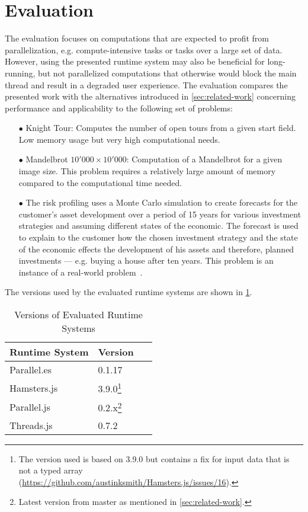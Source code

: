 \section{Evaluation}\label{sec:evaluation}
The evaluation focuses on computations that are expected to profit from parallelization, e.g. compute-intensive tasks or tasks over a large set of data. However, using the presented runtime system may also be beneficial for long-running, but not parallelized computations that otherwise would block the main thread and result in a degraded user experience. The evaluation compares the presented work with the alternatives introduced in \cref{sec:related-work} concerning performance and applicability to the following set of problems:

\begin{itemize}
	\item[$\bullet$] Knight Tour: Computes the number of open tours from a given start field. Low memory usage but very high computational needs.
	\item[$\bullet$] Mandelbrot $10'000 \times 10'000$: Computation of a Mandelbrot for a given image size. This problem requires a relatively large amount of memory compared to the computational time needed.
	\item[$\bullet$] The risk profiling uses a Monte Carlo simulation to create forecasts for the customer's asset development over a period of 15 years for various investment strategies and assuming different states of the economic. The forecast is used to explain to the customer how the chosen investment strategy and the state of the economic effects the development of his assets and therefore, planned investments --- e.g. buying a house after ten years. This problem is an instance of a real-world problem~\cite{Kwsoft2016}.
\end{itemize}

The versions used by the evaluated runtime systems are shown in \cref{tab:runtime-system-version}.

\begin{table}
	\centering
	\begin{tabular}{p{0.6\linewidth} l}
		\toprule
		Runtime System & Version \\ \midrule
		Parallel.es & 0.1.17 \\
		Hamsters.js & 3.9.0\footnote{The version used is based on 3.9.0 but contains a fix for input data that is not a typed array (\url{https://github.com/austinksmith/Hamsters.js/issues/16}).} \\
		Parallel.js & 0.2.x\footnote{Latest version from master as mentioned in \cref{sec:related-work}.} \\
		Threads.js & 0.7.2 \\ \bottomrule
	\end{tabular}
	\caption{Versions of Evaluated Runtime Systems}
	\label{tab:runtime-system-version}
\end{table}


